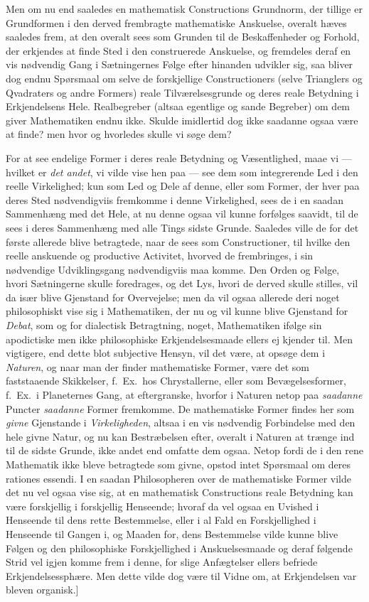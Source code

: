 \documentclass[12pt,a4paper]{book}
\newcommand{\apage}[1]{\marginnote{\footnotesize\textit{[#1]}}}
\begin{document}
Men om nu end saaledes en mathematisk Constructions Grundnorm, der tillige er
Grundformen i den derved frembragte mathematiske Anskuelse, overalt hæves saaledes
frem, at den overalt sees som Grunden til de Beskaffenheder og Forhold, \apage{83}  der
erkjendes at finde Sted i den construerede Anskuelse, og fremdeles deraf en vis
nødvendig Gang i Sætningernes Følge efter hinanden udvikler sig, saa bliver dog
endnu Spørsmaal om selve de forskjellige Constructioners (selve Trianglers og
Qvadraters og andre Formers) reale Tilværelsesgrunde og deres reale Betydning i
Erkjendelsens Hele. Realbegreber (altsaa egentlige og sande Begreber) om dem
giver Mathematiken endnu ikke. Skulde imidlertid dog ikke saadanne ogsaa være at
finde? men hvor og hvorledes skulle vi søge dem?

For at see endelige Former i deres reale Betydning og Væsentlighed, maae vi ---
hvilket er \emph{det andet}, vi vilde vise hen paa --- see dem som integrerende
Led i den reelle Virkelighed; kun som Led og Dele af denne, eller som Former, der
hver paa deres Sted nødvendigviis fremkomme i denne Virkelighed, sees de i en
saadan Sammenhæng med det Hele, at nu denne ogsaa vil kunne forfølges saavidt,
til de sees i deres Sammenhæng med alle Tings sidste Grunde. Saaledes ville de
for det første allerede blive betragtede, naar de sees som Constructioner, til
hvilke den reelle anskuende og productive Activitet, hvorved de frembringes, i sin
nødvendige Udviklingsgang nødvendigviis maa komme. Den Orden og Følge, hvori
Sætningerne skulle foredrages, og det Lys, hvori \apage{84}  de derved skulle stilles, vil da
især blive Gjenstand for Overvejelse; men da vil ogsaa allerede deri noget
philosophiskt vise sig i Mathematiken, der nu og vil kunne blive Gjenstand for
\emph{Debat}, som og for dialectisk Betragtning, noget, Mathematiken ifølge sin
apodictiske men ikke philosophiske Erkjendelsesmaade ellers ej kjender til. Men
vigtigere, end dette blot subjective Hensyn, vil det være, at opsøge dem i
\emph{Naturen}, og naar man der finder mathematiske Former, være det som
faststaaende Skikkelser, f.~Ex.\ hos Chrystallerne, eller som Bevægelsesformer,
f.~Ex.\ i Planeternes Gang, at eftergranske, hvorfor i Naturen netop paa
\emph{saadanne} Puncter \emph{saadanne} Former fremkomme. De mathematiske Former findes her
som \emph{givne} Gjenstande i \emph{Virkeligheden}, altsaa i en vis nødvendig
Forbindelse med den hele givne Natur, og nu kan Bestræbelsen efter, overalt i
Naturen at trænge ind til de sidste Grunde, ikke andet end omfatte dem ogsaa.
Netop fordi de i den rene Mathematik ikke bleve betragtede som givne, opstod
intet Spørsmaal om deres rationes essendi. I en saadan Philosopheren over de
mathematiske Former vilde det nu vel ogsaa vise sig, at en mathematisk
Constructions reale Betydning kan være forskjellig i forskjellig Henseende;
hvoraf da vel ogsaa en Uvished i Henseende til dens rette Bestemmelse, eller i al
Fald en Forskjellighed i Henseende til Gangen i, \apage{85} og Maaden for, dens Bestemmelse
vilde kunne blive Følgen og den philosophiske Forskjellighed i Anskuelsesmaade og
deraf følgende Strid vel igjen komme frem i denne, for slige Anfægtelser ellers
befriede Erkjendelsessphære. Men dette vilde dog være til Vidne om, at
Erkjendelsen var bleven organisk.]
\end{document}
